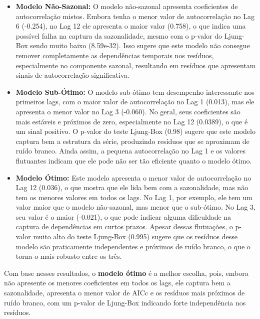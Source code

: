 \documentclass[a4paper, 12pt]{article}
\begin{document}
\begin{itemize}
    \item \textbf{Modelo Não-Sazonal:}  O modelo não-sazonal apresenta coeficientes de autocorrelação mistos. Embora tenha o menor valor de autocorrelação no Lag 6 (-0.254), no Lag 12 ele apresenta o maior valor (0.758), o que indica uma possível falha na captura da sazonalidade, mesmo com o p-valor do Ljung-Box sendo muito baixo (8.59e-32). Isso sugere que este modelo não consegue remover completamente as dependências temporais nos resíduos, especialmente no componente sazonal, resultando em resíduos que apresentam sinais de autocorrelação significativa.
    \item \textbf{Modelo Sub-Ótimo:} O modelo sub-ótimo tem desempenho interessante nos primeiros lags, com o maior valor de autocorrelação no Lag 1 (0.013), mas ele apresenta o menor valor no Lag 3 (-0.060). No geral, seus coeficientes são mais estáveis e próximos de zero, especialmente no Lag 12 (0.0389), o que é um sinal positivo. O p-valor do teste Ljung-Box (0.98) sugere que este modelo captura bem a estrutura da série, produzindo resíduos que se aproximam de ruído branco. Ainda assim, a pequena autocorrelação no Lag 1 e os valores flutuantes indicam que ele pode não ser tão eficiente quanto o modelo ótimo.

    \item \textbf{Modelo Ótimo:} Este modelo apresenta o menor valor de autocorrelação no Lag 12 (0.036), o que mostra que ele lida bem com a sazonalidade, mas não tem os menores valores em todos os lags. No Lag 1, por exemplo, ele tem um valor maior que o modelo não-sazonal, mas menor que o sub-ótimo. No Lag 3, seu valor é o maior (-0.021), o que pode indicar alguma dificuldade na captura de dependências em curtos prazos. Apesar dessas flutuações, o p-valor muito alto do teste Ljung-Box (0.995) sugere que os resíduos desse modelo são praticamente independentes e próximos de ruído branco, o que o torna o mais robusto entre os três.
    
    
\end{itemize}

Com base nesses resultados, o \textbf{modelo ótimo} é a melhor escolha, pois, embora não apresente os menores coeficientes em todos os lags, ele captura bem a sazonalidade, apresenta o menor valor de AICc e os resíduos mais próximos de ruído branco, com um p-valor de Ljung-Box indicando forte independência nos resíduos.\\\\
\end{document}
